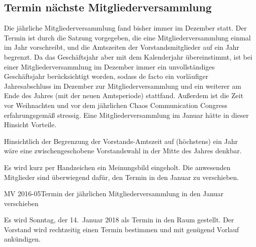\documentclass{s0minutes}
\begin{document}
\subsection{Termin nächste Mitgliederversammlung}
Die jährliche Mitgliederversammlung fand bisher immer im Dezember statt. Der
Termin ist durch die Satzung vorgegeben, die eine Mitgliederversammlung einmal
im Jahr vorschreibt, und die Amtszeiten der Vorstandsmitglieder auf ein Jahr
begrenzt. Da das Geschäftsjahr aber mit dem Kalenderjahr übereinstimmt, ist bei
einer Mitgliederversammlung im Dezember immer ein unvollständiges Geschäftsjahr
berücksichtigt worden, sodass de facto ein vorläufiger Jahresabschluss im
Dezember zur Mitgliederversammlung und ein weiterer am Ende des Jahres (mit der
neuen Amtsperiode) stattfand. Außerdem ist die Zeit vor Weihnachten und vor dem
jährlichen Chaos Communication Congress erfahrungsgemäß stressig. Eine
Mitgliederversammlung im Januar hätte in dieser Hinsicht Vorteile.

Hinsichtlich der Begrenzung der Vorstands-Amtszeit auf (höchstens) ein Jahr wäre
eine zwischengeschobene Vorstandswahl in der Mitte des Jahres denkbar.

Es wird kurz per Handzeichen ein Meinungsbild eingeholt. Die anwesenden
Mitglieder sind überwiegend dafür, den Termin in den Januar zu verschieben.

\begin{resolution}{MV 2016-05}{\consensus{\adopted}}{Termin der jährlichen
  Mitgliederversammlung in den Januar verschieben}{}
\end{resolution}

Es wird Sonntag, der 14.\, Januar 2018 als Termin in den Raum gestellt. Der
Vorstand wird rechtzeitig einen Termin bestimmen und mit genügend Vorlauf
ankündigen.

\end{document}
